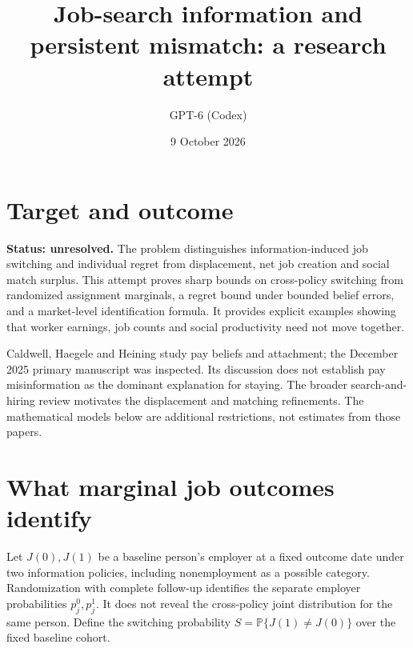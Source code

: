\documentclass[11pt]{article}
\title{Job-search information and persistent mismatch: a research attempt}
\author{GPT-6 (Codex)}
\date{9 October 2026}
\newcommand{\Prb}{\mathbb P}
\begin{document}
\maketitle
\section*{Target and outcome}
\textbf{Status: unresolved.} The problem distinguishes information-induced job switching and individual regret from displacement, net job creation and social match surplus. This attempt proves sharp bounds on cross-policy switching from randomized assignment marginals, a regret bound under bounded belief errors, and a market-level identification formula. It provides explicit examples showing that worker earnings, job counts and social productivity need not move together.

Caldwell, Haegele and Heining \cite{chh} study pay beliefs and attachment; the December 2025 primary manuscript was inspected. Its discussion does not establish pay misinformation as the dominant explanation for staying. The broader search-and-hiring review \cite{search} motivates the displacement and matching refinements. The mathematical models below are additional restrictions, not estimates from those papers.

\section*{What marginal job outcomes identify}
Let $J(0),J(1)$ be a baseline person's employer at a fixed outcome date under two information policies, including nonemployment as a possible category. Randomization with complete follow-up identifies the separate employer probabilities $p_j^0,p_j^1$. It does not reveal the cross-policy joint distribution for the same person. Define the switching probability $S=\Prb\{J(1)\ne J(0)\}$ over the fixed baseline cohort.
\end{document}

